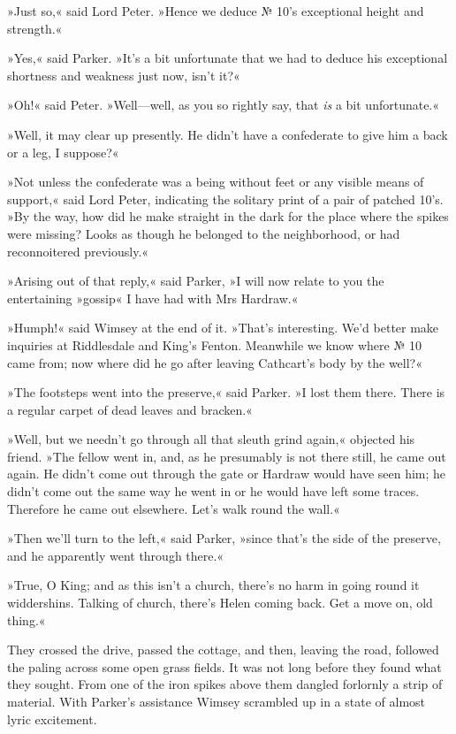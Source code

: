 »Just so,« said Lord Peter. »Hence we deduce № 10's exceptional height and strength.«

»Yes,« said Parker. »It's a bit unfortunate that we had to deduce his exceptional shortness and weakness just now, isn't it?«

»Oh!« said Peter. »Well\allowbreak---\allowbreak well, as you so rightly say, that \textit{is} a bit unfortunate.«

»Well, it may clear up presently. He didn't have a confederate to give him a back or a leg, I suppose?«

»Not unless the confederate was a being without feet or any visible means of support,« said Lord Peter, indicating the solitary print of a pair of patched 10's. »By the way, how did he make straight in the dark for the place where the spikes were missing? Looks as though he belonged to the neighborhood, or had reconnoitered previously.«

»Arising out of that reply,« said Parker, »I will now relate to you the entertaining »gossip« I have had with Mrs Hardraw.«

»Humph!« said Wimsey at the end of it. »That's interesting. We'd better make inquiries at Riddlesdale and King's Fenton. Meanwhile we know where № 10 came from; now where did he go after leaving Cathcart's body by the well?«

»The footsteps went into the preserve,« said Parker. »I lost them there. There is a regular carpet of dead leaves and bracken.«

»Well, but we needn't go through all that sleuth grind again,« objected his friend. »The fellow went in, and, as he presumably is not there still, he came out again. He didn't come out through the gate or Hardraw would have seen him; he didn't come out the same way he went in or he would have left some traces. Therefore he came out elsewhere.  Let's walk round the wall.«

»Then we'll turn to the left,« said Parker, »since that's the side of the preserve, and he apparently went through there.«

»True, O King; and as this isn't a church, there's no harm in going round it widdershins. Talking of church, there's Helen coming back. Get a move on, old thing.«

They crossed the drive, passed the cottage, and then, leaving the road, followed the paling across some open grass fields. It was not long before they found what they sought. From one of the iron spikes above them dangled forlornly a strip of material. With Parker's assistance Wimsey scrambled up in a state of almost lyric excitement.

